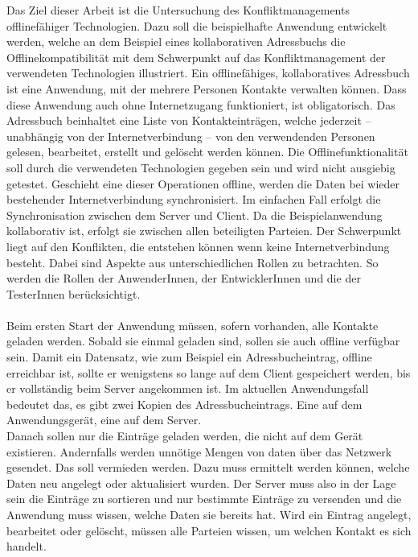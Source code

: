 Das Ziel dieser Arbeit ist die Untersuchung des Konfliktmanagements offlinefähiger Technologien.
Dazu soll die beispielhafte Anwendung entwickelt werden, welche an dem Beispiel eines kollaborativen Adressbuchs die Offlinekompatibilität mit dem Schwerpunkt auf das Konfliktmanagement der verwendeten Technologien illustriert.
Ein offlinefähiges, kollaboratives Adressbuch ist eine Anwendung, mit der mehrere Personen Kontakte verwalten können.
Dass diese Anwendung auch ohne Internetzugang funktioniert, ist obligatorisch.
Das Adressbuch beinhaltet eine Liste von Kontakteinträgen, welche jederzeit -- unabhängig von der Internetverbindung -- von den verwendenden Personen gelesen, bearbeitet, erstellt und gelöscht werden können.
Die Offlinefunktionalität soll durch die verwendeten Technologien gegeben sein und wird nicht ausgiebig getestet.
Geschieht eine dieser Operationen offline, werden die Daten bei wieder bestehender Internetverbindung synchronisiert. Im einfachen Fall erfolgt die Synchronisation zwischen dem Server und Client.
Da die Beispielanwendung kollaborativ ist, erfolgt sie zwischen allen beteiligten Parteien.
Der Schwerpunkt liegt auf den Konflikten, die entstehen können wenn keine Internetverbindung besteht.
Dabei sind Aspekte aus unterschiedlichen Rollen zu betrachten. So werden die Rollen der AnwenderInnen, der EntwicklerInnen und die der TesterInnen berücksichtigt.\\\\
%
%
Beim ersten Start der Anwendung müssen, sofern vorhanden, alle Kontakte geladen werden. Sobald sie einmal geladen sind, sollen sie auch offline verfügbar sein.
Damit ein Datensatz, wie zum Beispiel ein Adressbucheintrag, offline erreichbar ist, sollte er wenigstens so lange auf dem Client gespeichert werden, bis er vollständig beim Server angekommen ist.
Im aktuellen Anwendungsfall bedeutet das, es gibt zwei Kopien des Adressbucheintrags. Eine auf dem Anwendungsgerät, eine auf dem Server.\\
Danach sollen nur die Einträge geladen werden, die nicht auf dem Gerät existieren.
Andernfalls werden unnötige Mengen von daten über das Netzwerk gesendet. Das soll vermieden werden.
Dazu muss ermittelt werden können, welche Daten neu angelegt oder aktualisiert wurden.
Der Server muss also in der Lage sein die Einträge zu sortieren und nur bestimmte Einträge zu versenden und die Anwendung muss wissen, welche Daten sie bereits hat. Wird ein Eintrag angelegt, bearbeitet oder gelöscht, müssen alle Parteien wissen, um welchen Kontakt es sich handelt.

